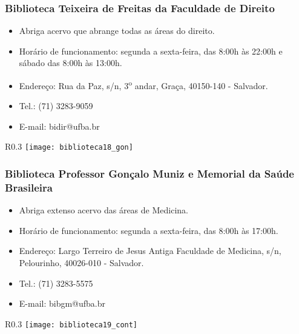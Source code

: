     \subsubsection{Biblioteca Teixeira de Freitas da Faculdade de Direito}
        \begin{itemize}
            \item Abriga acervo que abrange todas as áreas do direito.
            \item Horário de funcionamento: segunda a sexta-feira, das 8:00h às 22:00h e sábado das 8:00h às 13:00h.
            \item Endereço: Rua da Paz, s/n, 3\textsuperscript{o} andar, Graça, 40150-140 - Salvador.
            \item Tel.: (71) 3283-9059
            \item E-mail: bidir@ufba.br
        \end{itemize}
        \begin{wrapfigure}{R}{0.3\textwidth}
            \centering
            \texttt{[image: biblioteca18\_gon]}
        \end{wrapfigure}
    \subsubsection{Biblioteca Professor Gonçalo Muniz e Memorial da Saúde Brasileira}
        \begin{itemize}
            \item Abriga extenso acervo das áreas de Medicina.
            \item Horário de funcionamento: segunda a sexta-feira, das 8:00h às 17:00h.
            \item Endereço: Largo Terreiro de Jesus Antiga Faculdade de Medicina, s/n, Pelourinho, 40026-010 - Salvador.
            \item Tel.: (71) 3283-5575
            \item E-mail: bibgm@ufba.br
        \end{itemize}
        \begin{wrapfigure}{R}{0.3\textwidth}
            \centering
            \texttt{[image: biblioteca19\_cont]}
        \end{wrapfigure}
